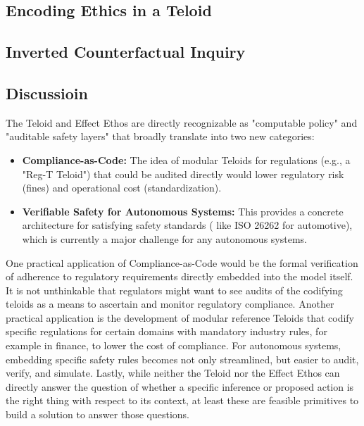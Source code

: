 \newpage

\subsection{Encoding Ethics in a Teloid}

\subsection{Inverted Counterfactual Inquiry}

\subsection{Discussioin}

The  Teloid and Effect Ethos are directly recognizable as "computable policy" and "auditable safety
layers" that broadly translate into two new categories:

\begin{itemize}
  \item \textbf{Compliance-as-Code:} The idea of modular Teloids for regulations (e.g., a "Reg-T Teloid") that could be audited
  directly would lower regulatory risk (fines) and operational cost (standardization).
  \item \textbf{Verifiable Safety for Autonomous Systems:} This provides a concrete architecture for satisfying safety standards (
  like ISO 26262 for automotive), which is currently a major challenge for any autonomous systems.
\end{itemize}


One practical application of Compliance-as-Code would be the formal verification of adherence to regulatory requirements
directly embedded into the model itself. It is not unthinkable that regulators might want to see audits of the codifying
teloids as a means to ascertain and monitor regulatory compliance. Another practical application is the development of
modular reference Teloids that codify specific regulations for certain domains with mandatory industry rules,
for example in finance, to lower the cost of compliance. For autonomous systems, embedding specific safety rules
becomes not only streamlined, but easier to audit, verify, and simulate. Lastly, while neither the Teloid nor the Effect
Ethos can directly answer the question of whether a specific inference or proposed action is the right thing
with respect to its context, at least these are feasible primitives to build a solution to answer those questions.


